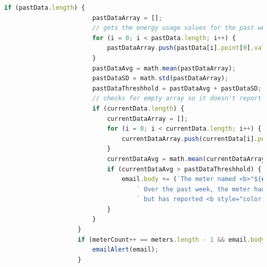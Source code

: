 \documentclass[letterpaper,10pt,serif,draftclsnofoot,onecolumn,compsoc,titlepage]{IEEEtran}
\begin{document}
\begin{lstlisting}[language=JavaScript]
                    if (pastData.length) {
                        pastDataArray = [];
                        // gets the energy usage values for the past week
                        for (i = 0; i < pastData.length; i++) {
                            pastDataArray.push(pastData[i].point[0].value);
                        }
                        pastDataAvg = math.mean(pastDataArray);
                        pastDataSD = math.std(pastDataArray);
                        pastDataThreshhold = pastDataAvg + pastDataSD;
                        // checks for empty array so it doesn't report on down meter
                        if (currentData.length) {
                            currentDataArray = [];
                            for (i = 0; i < currentData.length; i++) {
                                currentDataArray.push(currentData[i].point[0].value);
                            }
                            currentDataAvg = math.mean(currentDataArray);
                            if (currentDataAvg > pastDataThreshhold) {
                                email.body += (`The meter named <b>"${e.name}"</b> with a serial of <b>"${e.meter_id}"</b> has reported high energy usage.` +
                                    ` Over the past week, the meter had an average of <b>${pastDataAvg.toFixed(1)}</b> kWh,` +
                                    ` but has reported <b style="color:red">${currentDataAvg.toFixed(1)}</b> kWh in the past 24 hours. <br>`)
                            }
                        }
                    }
                    if (meterCount++ == meters.length - 1 && email.body !== '') {
                        emailAlert(email);
                    }
\end{lstlisting}
\end{document}
